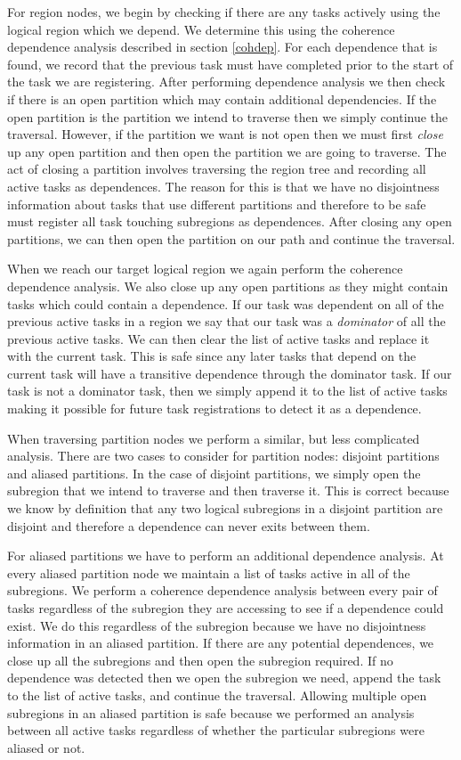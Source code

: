 For region nodes, we begin by checking if there are any tasks actively using the logical
region which we depend.  We determine this using the coherence dependence analysis described 
in section \ref{cohdep}.  For each dependence that is found, we record that the previous
task must have completed prior to the start of the task we are registering.  After performing
dependence analysis we then check if there is an open partition which may contain additional
dependencies.  If the open partition is the partition we intend to traverse then we
simply continue the traversal.  However, if the partition we want is not open then we must
first {\em close} up any open partition and then open the partition we are going to
traverse.  The act of closing a partition involves traversing the region tree and recording
all active tasks as dependences.  The reason for this is that we have no disjointness
information about tasks that use different partitions and therefore to be safe must register
all task touching subregions as dependences.  After closing any open partitions, we
can then open the partition on our path and continue the traversal.

When we reach our target logical region we again perform the coherence dependence analysis.
We also close up any open partitions as they might contain tasks which could contain
a dependence.  If our task was dependent on all of the previous active tasks in a region
we say that our task was a {\em dominator} of all the previous active tasks.  We can
then clear the list of active tasks and replace it with the current task.  This is safe since
any later tasks that depend on the current task will have a transitive dependence 
through the dominator task.  If our task is not a dominator task, then we simply append
it to the list of active tasks making it possible for future task registrations to detect
it as a dependence.

When traversing partition nodes we perform a similar, but less complicated analysis.  There
are two cases to consider for partition nodes: disjoint partitions and aliased partitions.
In the case of disjoint partitions, we simply open the subregion that we intend to traverse
and then traverse it.  This is correct because we know by definition that any two logical
subregions in a disjoint partition are disjoint and therefore a dependence can never exits
between them.

For aliased partitions we have to perform an additional dependence analysis.  At every
aliased partition node we maintain a list of tasks active in all of the subregions.  We
perform a coherence dependence analysis between every pair of tasks regardless of the subregion
they are accessing to see if a dependence could exist.  We do this regardless of the subregion
because we have no disjointness information in an aliased partition.  If there are any
potential dependences, we close up all the subregions and then open the subregion required.  If
no dependence was detected then we open the subregion we need, append the task to the list
of active tasks, and continue the traversal.  Allowing multiple open subregions in an aliased
partition is safe because we performed an analysis between all active tasks regardless of
whether the particular subregions were aliased or not.

